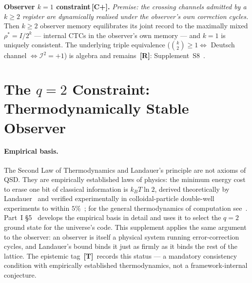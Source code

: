 \documentclass[11pt,a4paper]{article}
\newcommand{\Rmark}{\textcolor{green!50!black}{\textbf{[R]}}}
\newcommand{\Cpmark}{\textcolor{blue!70!black}{\textbf{[C+]}}}
\newcommand{\Tmark}{\textcolor{orange!70!black}{\textbf{[T]}}}
\begin{document}
\begin{mdframed}[backgroundcolor=Rbg,linecolor=Rcolor,linewidth=1.5pt]
\textbf{Observer $k=1$ constraint\,\Cpmark.}\quad
\emph{Premise: the crossing channels admitted by a $k\geq2$ register are dynamically realised under the observer's own correction cycles.} Then $k\geq2$ observer memory equilibrates its joint record to the maximally mixed $\rho^*=I/2^k$ --- internal CTCs in the observer's own memory --- and $k=1$ is uniquely consistent. The underlying triple equivalence ($\binom{k}{2}\geq1 \Leftrightarrow$ Deutsch channel $\Leftrightarrow \mathcal{I}^2=+1$) is algebra and remains~\Rmark: Supplement~S8~\cite{Hubka2026QSDSupp}.
\end{mdframed}

\section{The $q=2$ Constraint: Thermodynamically Stable Observer}
\label{sec:q2}

\paragraph{Empirical basis.}
The Second Law of Thermodynamics and Landauer's principle are not axioms of QSD. They are empirically established laws of physics: the minimum energy cost to erase one bit of classical information is $k_B T\ln 2$, derived theoretically by Landauer~\cite{Landauer1961} and verified experimentally in colloidal-particle double-well experiments to within $5\%$~\cite{Berut2012}; for the general thermodynamics of computation see~\cite{Bennett1982}. Part~I \S5~\cite{Hubka2026QSD} develops the empirical basis in detail and uses it to select the $q=2$ ground state for the universe's code. This supplement applies the same argument to the observer: an observer is itself a physical system running error-correction cycles, and Landauer's bound binds it just as firmly as it binds the rest of the lattice. The epistemic tag~\Tmark\ records this status --- a mandatory consistency condition with empirically established thermodynamics, not a framework-internal conjecture.
\end{document}
